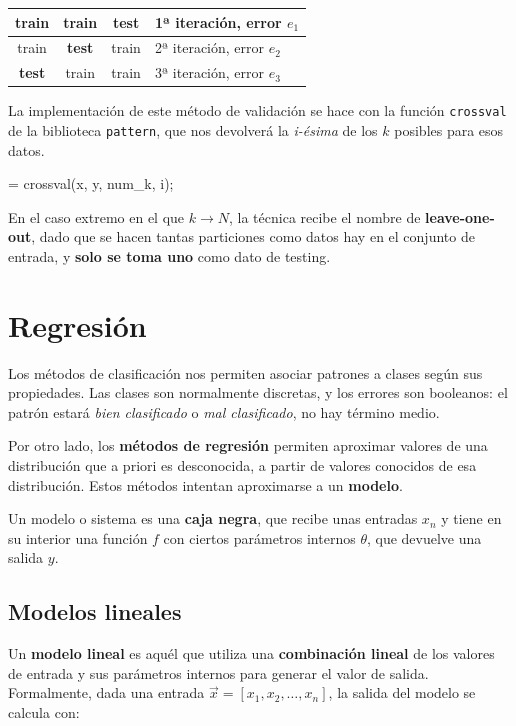 \documentclass[11pt]{scrartcl}
\begin{document}
\begin{center}
  \begin{tabular}{c|c|c|l}
    train & train & \textbf{test}  & 1ª iteración, error $e_1$ \\ \hline
    train & \textbf{test}  & train & 2ª iteración, error $e_2$ \\ \hline
    \textbf{test}  & train & train & 3ª iteración, error $e_3$
  \end{tabular}
\end{center}

La implementación de este método de validación se hace con la función
\texttt{crossval} de la biblioteca \texttt{pattern}, que nos devolverá la
\textit{i-ésima} de los $k$ posibles para esos datos.

\begin{matlabcode}
 = crossval(x, y, num_k, i);  
\end{matlabcode}

En el caso extremo en el que $k \rightarrow N$, la técnica recibe el nombre de
\textbf{leave-one-out}, dado que se hacen tantas particiones como datos hay en
el conjunto de entrada, y \textbf{solo se toma uno} como dato de testing.

\section{Regresión}

Los métodos de clasificación nos permiten asociar patrones a clases según sus
propiedades. Las clases son normalmente discretas, y los errores son booleanos:
el patrón estará \textit{bien clasificado} o \textit{mal clasificado}, no hay
término medio.

Por otro lado, los \textbf{métodos de regresión} permiten aproximar valores de
una distribución que a priori es desconocida, a partir de valores conocidos de
esa distribución. Estos métodos intentan aproximarse a un \textbf{modelo}.

Un modelo o sistema es una \textbf{caja negra}, que recibe unas entradas $x_n$ y
tiene en su interior una función $f$ con ciertos parámetros internos $\theta$,
que devuelve una salida $y$.

\subsection{Modelos lineales}

Un \textbf{modelo lineal} es aquél que utiliza una \textbf{combinación lineal}
de los valores de entrada y sus parámetros internos para generar el valor de
salida. Formalmente, dada una entrada $\vec{x} = [x_1, x_2, \ldots, x_n]$, la
salida del modelo se calcula con:
\end{document}
